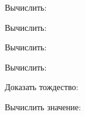 \begin{listofex}
	\item Вычислить:
	\begin{enumcols}[itemcolumns=1]
		\item {}
		\item {}
	\end{enumcols}
	\item Вычислить:
	\begin{enumcols}[itemcolumns=1]
		\item {}
		\item {}
	\end{enumcols}
	\item Вычислить:
	\begin{enumcols}[itemcolumns=2]
		\item {}
		\item {}
		\item {}
		\item {}
	\end{enumcols}
	\item Вычислить:
	\begin{enumcols}[itemcolumns=2]
		\item {}
		\item {}
		\item {}
	\end{enumcols}
	\item Доказать тождество:
	\begin{enumcols}[itemcolumns=2]
		\item {}
		\item {}
		\item {}
	\end{enumcols}
	\item Вычислить значение:
	\begin{enumcols}[itemcolumns=1]
		\item {}
		\item {}
	\end{enumcols}
\end{listofex}
